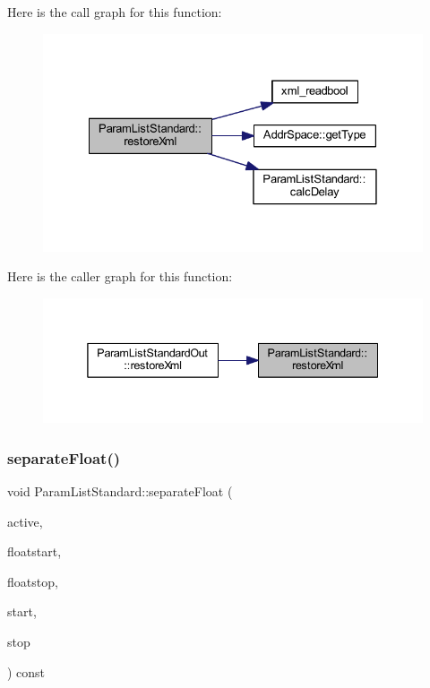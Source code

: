 Here is the call graph for this function\+:
\nopagebreak
\begin{figure}[H]
\begin{center}
\leavevmode
\includegraphics[width=328pt]{class_param_list_standard_a7dc8219ff6422f4e23d12643b68eb100_cgraph}
\end{center}
\end{figure}
Here is the caller graph for this function\+:
\nopagebreak
\begin{figure}[H]
\begin{center}
\leavevmode
\includegraphics[width=338pt]{class_param_list_standard_a7dc8219ff6422f4e23d12643b68eb100_icgraph}
\end{center}
\end{figure}
\mbox{\label{class_param_list_standard_aacdd4138b9b70be59a0033514cbb6abb}} 
\subsubsection{\texorpdfstring{separateFloat()}{separateFloat()}}
{\footnotesize\ttfamily void Param\+List\+Standard\+::separate\+Float (\begin{DoxyParamCaption}\item[{\mbox{\hyperlink{class_param_active}{Param\+Active}} $\ast$}]{active,  }\item[{int4 \&}]{floatstart,  }\item[{int4 \&}]{floatstop,  }\item[{int4 \&}]{start,  }\item[{int4 \&}]{stop }\end{DoxyParamCaption}) const\hspace{0.3cm}{\ttfamily [protected]}}



